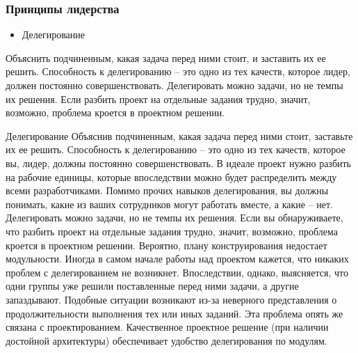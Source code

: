 \documentclass{../industrial-development}
\begin{document}
\begin{frame} \frametitle{Принципы лидерства}
 \begin{block}{}
\begin{itemize}
  \item Делегирование
  \end{itemize}
 \end{block}
Объяснить подчиненным, какая задача перед ними стоит, и заставить их ее решить.  Способность к делегированию – это одно из тех качеств, которое лидер, должен постоянно совершенствовать. 
Делегировать можно задачи, но не темпы их решения. Если разбить проект на отдельные задания трудно, значит, возможно, проблема кроется в проектном решении. 
\end{frame}
\lecturenotes
Делегирование
Объяснив подчиненным, какая задача перед ними стоит, заставьте их ее решить.  Способность к делегированию – это одно из тех качеств, которое вы, лидер, должны постоянно совершенствовать. 
В идеале проект нужно разбить на рабочие единицы, которые впоследствии можно будет распределить между всеми разработчиками. Помимо прочих навыков делегирования, вы должны понимать, какие из ваших сотрудников могут работать вместе, а какие – нет.
Делегировать можно задачи, но не темпы их решения. Если вы обнаруживаете, что разбить проект на отдельные задания трудно, значит, возможно, проблема кроется в проектном решении. Вероятно, плану конструирования недостает модульности. Иногда в самом начале работы над проектом кажется, что никаких проблем с делегированием не возникнет. Впоследствии, однако, выясняется, что одни группы уже решили поставленные перед ними задачи, а другие запаздывают. Подобные ситуации возникают из-за неверного представления о продолжительности выполнения тех или иных заданий. Эта проблема опять же связана с проектированием. Качественное проектное решение (при наличии достойной архитектуры) обеспечивает удобство делегирования по модулям.

~\cite{How_to_be_a_good_IT-manager}
\end{document}
